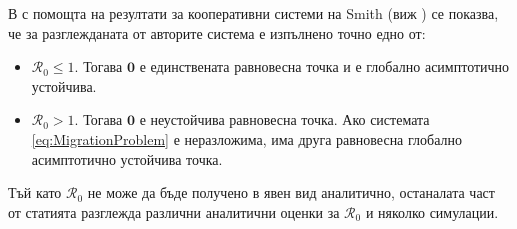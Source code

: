 В \cite{Bichara2016} с помощта на резултати за кооперативни системи на Smith (виж \cite{Smith1986}) се показва, че за разглежданата от авторите система е изпълнено точно едно от:
\begin{itemize}
  \item $\mathscr{R}_0 \leq 1$. Тогава $\mathbf{0}$ е единствената равновесна точка и е глобално асимптотично устойчива.
  \item $\mathscr{R}_0 > 1$. Тогава $\mathbf{0}$ е неустойчива равновесна точка. Ако системата \eqref{eq:MigrationProblem} е неразложима, има друга равновесна глобално асимптотично устойчива точка.
\end{itemize}

Тъй като $\mathscr{R}_0$ не може да бъде получено в явен вид аналитично, останалата част от статията \cite{Bichara2016} разглежда различни аналитични оценки за $\mathscr{R}_0$ и няколко симулации.




